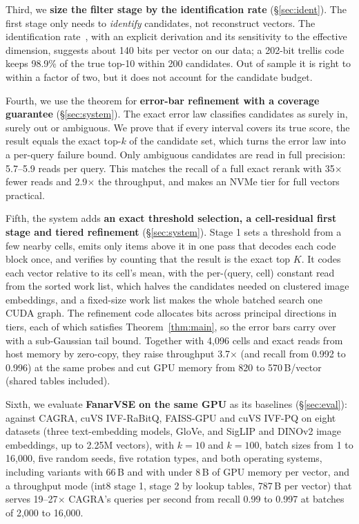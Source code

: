 \documentclass[fleqn,10pt]{wlscirep}
\begin{document}
Third, we \textbf{size the filter stage by the identification rate} (\S\ref{sec:ident}). The first stage only needs to \emph{identify} candidates, not reconstruct vectors. The identification rate~\cite{ingber2015identification}, with an explicit derivation and its sensitivity to the effective dimension, suggests about 140 bits per vector on our data; a 202-bit trellis code keeps 98.9\% of the true top-10 within 200 candidates. Out of sample it is right to within a factor of two, but it does not account for the candidate budget.

Fourth, we use the theorem for \textbf{error-bar refinement with a coverage guarantee} (\S\ref{sec:system}). The exact error law classifies candidates as surely in, surely out or ambiguous. We prove that if every interval covers its true score, the result equals the exact top-$k$ of the candidate set, which turns the error law into a per-query failure bound. Only ambiguous candidates are read in full precision: 5.7--5.9 reads per query. This matches the recall of a full exact rerank with 35$\times$ fewer reads and 2.9$\times$ the throughput, and makes an NVMe tier for full vectors practical.

Fifth, the system adds \textbf{an exact threshold selection, a cell-residual first stage and tiered refinement} (\S\ref{sec:system}). Stage 1 sets a threshold from a few nearby cells, emits only items above it in one pass that decodes each code block once, and verifies by counting that the result is the exact top $K$. It codes each vector relative to its cell's mean, with the per-(query, cell) constant read from the sorted work list, which halves the candidates needed on clustered image embeddings, and a fixed-size work list makes the whole batched search one CUDA graph. The refinement code allocates bits across principal directions in tiers, each of which satisfies Theorem~\ref{thm:main}, so the error bars carry over with a sub-Gaussian tail bound. Together with 4{,}096 cells and exact reads from host memory by zero-copy, they raise throughput 3.7$\times$ (and recall from 0.992 to 0.996) at the same probes and cut GPU memory from 820 to 570\,B/vector (shared tables included).

Sixth, we evaluate \textbf{FanarVSE on the same GPU} as its baselines (\S\ref{sec:eval}): against CAGRA, cuVS IVF-RaBitQ, FAISS-GPU and cuVS IVF-PQ on eight datasets (three text-embedding models, GloVe, and SigLIP and DINOv2 image embeddings, up to 2.25M vectors), with $k=10$ and $k=100$, batch sizes from 1 to 16{,}000, five random seeds, five rotation types, and both operating systems, including variants with 66\,B and with under 8\,B of GPU memory per vector, and a throughput mode (int8 stage 1, stage 2 by lookup tables, 787\,B per vector) that serves 19--27$\times$ CAGRA's queries per second from recall 0.99 to 0.997 at batches of 2{,}000 to 16{,}000.
\end{document}
